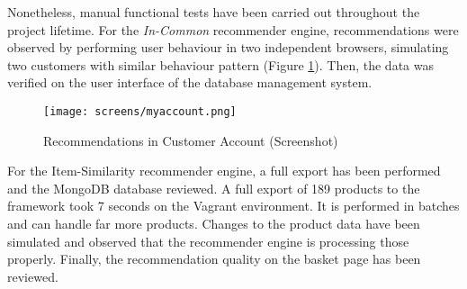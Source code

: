 Nonetheless, manual functional tests have been carried out throughout the project lifetime. For the \emph{In-Common} recommender engine, recommendations were observed by performing user behaviour in two independent browsers, simulating two customers with similar behaviour pattern (Figure \ref{fig:testing-magento-myaccount}). Then, the data was verified on the user interface of the database management system.

\begin{figure}[!ht]
    \texttt{[image: screens/myaccount.png]}
    \caption{Recommendations in Customer Account (Screenshot)}
    \label{fig:testing-magento-myaccount}
\end{figure}

For the Item-Similarity recommender engine, a full export has been performed and the MongoDB database reviewed. A full export of 189 products to the framework took 7 seconds on the Vagrant environment. It is performed in batches and can handle far more products. Changes to the product data have been simulated and observed that the recommender engine is processing those properly. Finally, the recommendation quality on the basket page has been reviewed.